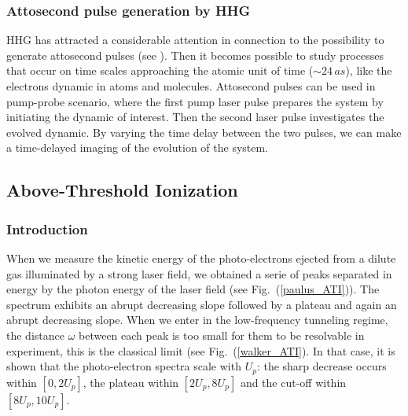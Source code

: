 \documentclass[a4paper]{article}
\begin{document}
\subsubsection{Attosecond pulse generation by HHG}
HHG has attracted a considerable attention in connection to the possibility to generate attosecond pulses (see \cite{Ivanov_2009}).
Then it becomes possible to study processes that occur on time scales approaching the atomic unit of time ($\sim 24\,as$), like the electrons dynamic in atoms and molecules. 
Attosecond pulses can be used in pump-probe scenario, where the first pump laser pulse prepares the system by initiating the dynamic of interest. Then the second laser pulse investigates the evolved dynamic. By varying the time delay between the two pulses, we can make a time-delayed imaging of the evolution of the system.


\subsection{Above-Threshold Ionization}
\subsubsection{Introduction}

When we measure the kinetic energy of the photo-electrons ejected from a dilute gas illuminated by a strong laser field, we obtained a serie of peaks separated in energy by the photon energy of the laser field (see Fig.~(\ref{paulus_ATI})). The spectrum exhibits an abrupt decreasing slope followed by a plateau and again an abrupt decreasing slope.
When we enter in the low-frequency tunneling regime, the distance $\omega$ between each peak is too small for them to be resolvable in experiment, this is the classical limit (see Fig.~(\ref{walker_ATI}). In that case, it is shown \cite{Walker_1996} that the photo-electron spectra scale with $U_{p}$: the sharp decrease occurs within $[0, 2U_{p}]$, the plateau within $[2U_{p}, 8U_{p}]$ and the cut-off within $[8U_{p}, 10U_{p}]$. 
\end{document}
